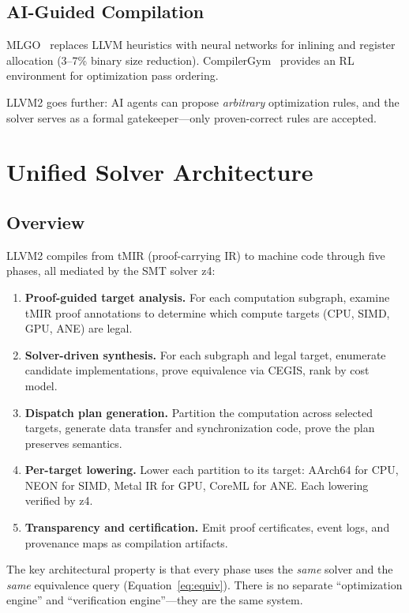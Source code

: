 \documentclass[11pt,twocolumn]{article}
\begin{document}
\subsection{AI-Guided Compilation}

MLGO~\cite{mlgo} replaces LLVM heuristics with neural networks for inlining and register allocation (3--7\% binary size reduction). CompilerGym~\cite{compilergym} provides an RL environment for optimization pass ordering.

LLVM2 goes further: AI agents can propose \emph{arbitrary} optimization rules, and the solver serves as a formal gatekeeper---only proven-correct rules are accepted.

\section{Unified Solver Architecture}
\label{sec:architecture}

\subsection{Overview}

LLVM2 compiles from tMIR (proof-carrying IR) to machine code through five phases, all mediated by the SMT solver z4:

\begin{enumerate}[leftmargin=*,topsep=4pt,itemsep=2pt]
\item \textbf{Proof-guided target analysis.} For each computation subgraph, examine tMIR proof annotations to determine which compute targets (CPU, SIMD, GPU, ANE) are legal.
\item \textbf{Solver-driven synthesis.} For each subgraph and legal target, enumerate candidate implementations, prove equivalence via CEGIS, rank by cost model.
\item \textbf{Dispatch plan generation.} Partition the computation across selected targets, generate data transfer and synchronization code, prove the plan preserves semantics.
\item \textbf{Per-target lowering.} Lower each partition to its target: AArch64 for CPU, NEON for SIMD, Metal IR for GPU, CoreML for ANE. Each lowering verified by z4.
\item \textbf{Transparency and certification.} Emit proof certificates, event logs, and provenance maps as compilation artifacts.
\end{enumerate}

The key architectural property is that every phase uses the \emph{same} solver and the \emph{same} equivalence query (Equation~\ref{eq:equiv}). There is no separate ``optimization engine'' and ``verification engine''---they are the same system.
\end{document}
